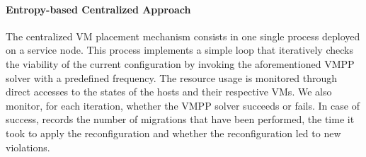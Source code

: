 \paragraph{Entropy-based Centralized Approach}
\label{subsec:entropy}
The centralized VM placement mechanism consists in one single \sg
process deployed on a service node. This process implements a simple loop that
iteratively checks the viability of the current configuration by
invoking the aforementioned VMPP solver with a predefined
frequency.
%
The resource usage is monitored through direct accesses
to the states of the hosts and their respective VMs.
%
%
We also monitor, for each iteration, whether the VMPP solver succeeds
or fails. In case of success, \vmps records the number of migrations
that have been performed, the time it took to apply the
reconfiguration and whether the reconfiguration
led to new violations.

